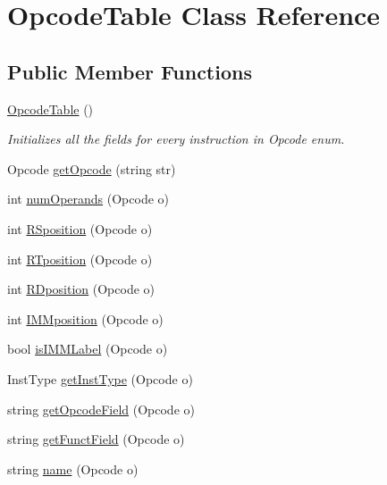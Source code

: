 \hypertarget{class_opcode_table}{}\section{Opcode\+Table Class Reference}
\label{class_opcode_table}
\subsection*{Public Member Functions}
\begin{DoxyCompactItemize}
\item 
\mbox{\hyperlink{class_opcode_table_acb286fdd22f1781abfb0d820b1f345aa}{Opcode\+Table}} ()
\begin{DoxyCompactList}\small\item\em Initializes all the fields for every instruction in Opcode enum. \end{DoxyCompactList}\item 
Opcode \mbox{\hyperlink{class_opcode_table_a0710950ceccf23e2e13d34ff51b332ce}{get\+Opcode}} (string str)
\item 
int \mbox{\hyperlink{class_opcode_table_af92b88d033ed5f2ba8cdf732ec3a0265}{num\+Operands}} (Opcode o)
\item 
int \mbox{\hyperlink{class_opcode_table_a6a2b017eeb7cfbc1bf614f52293c5ad4}{R\+Sposition}} (Opcode o)
\item 
int \mbox{\hyperlink{class_opcode_table_a408f6a63857a4443a66685de636b87fd}{R\+Tposition}} (Opcode o)
\item 
int \mbox{\hyperlink{class_opcode_table_ada77e4c8328f3a2730fc0974899da28f}{R\+Dposition}} (Opcode o)
\item 
int \mbox{\hyperlink{class_opcode_table_a588c7ea7780c6186ea685b632b231d33}{I\+M\+Mposition}} (Opcode o)
\item 
bool \mbox{\hyperlink{class_opcode_table_a5ef810fba22c54758dd69b09e8bfae8c}{is\+I\+M\+M\+Label}} (Opcode o)
\item 
Inst\+Type \mbox{\hyperlink{class_opcode_table_a6674e2b4716bddcaf2514a54bf63a5e4}{get\+Inst\+Type}} (Opcode o)
\item 
string \mbox{\hyperlink{class_opcode_table_af89738c82bb2406fa8eadf1639a86218}{get\+Opcode\+Field}} (Opcode o)
\item 
string \mbox{\hyperlink{class_opcode_table_ad535fbf9bee4c19a165c94b235daed00}{get\+Funct\+Field}} (Opcode o)
\item 
string \mbox{\hyperlink{class_opcode_table_a4021673f3dcfc1ef29fa4d7777838c96}{name}} (Opcode o)
\end{DoxyCompactItemize}


